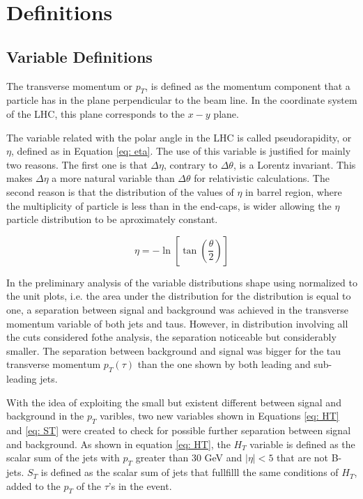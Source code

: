 \documentclass[12pt]{article}
\begin{document}
\section{Definitions} \label{sec:definitions}

\subsection{Variable Definitions}

The transverse momentum or $p_{T}$, is defined as the momentum component that a particle has in the plane perpendicular to the beam line. In the coordinate system of the LHC, this plane corresponds to the $x-y$ plane.

The variable related with the polar angle in the LHC is called pseudorapidity, or $\eta$, defined as in Equation \ref{eq: eta}. The use of this variable is justified for mainly two reasons. The first one is that $\Delta \eta$, contrary to $\Delta \theta$, is a Lorentz invariant. This makes $\Delta \eta$ a more natural variable than $\Delta \theta$ for relativistic calculations. The second reason is that the distribution of the values of $\eta$ in barrel region, where the multiplicity of particle is less than in the end-caps, is wider allowing the $\eta$ particle distribution to be aproximately constant.

\begin{equation}
 \eta = -\ln\left[\tan\left(\frac{\theta}{2}\right)\right]
 \label{eq: eta}
\end{equation}

In the preliminary analysis of the variable distributions shape using normalized to the unit plots, i.e. the area under the distribution for the distribution is equal to one, a separation between signal and background was achieved in the transverse momentum variable of both jets and taus. However, in distribution involving all the cuts considered fothe analysis, the separation noticeable but considerably smaller. The separation between background and signal was bigger for the tau transverse momentum $p_{T}(\tau)$ than the one shown by both leading and sub-leading jets.

With the idea of exploiting the small but existent different between signal and background in the $p_{T}$ varibles, two new variables shown in Equations \ref{eq: HT} and \ref{eq: ST} were created to check for possible further separation between signal and background. As shown in equation \ref{eq: HT}, the $H_{T}$ variable is defined as the scalar sum of the jets with $p_{T}$ greater than 30 GeV and $|\eta| < 5$ that are not B-jets. $S_{T}$ is defined as the scalar sum of jets that fullfilll the same conditions of $H_{T}$, added to the $p_{T}$ of the $\tau$'s in the event. 
\end{document}
